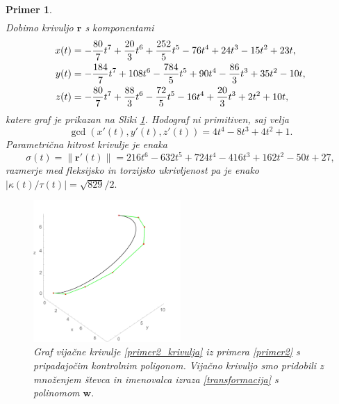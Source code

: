 \documentclass[12pt,a4paper,twoside]{article}
\theoremstyle{definition} %
\theoremstyle{plain} %
\theoremstyle{primerstyle}
\newtheorem{primer}[definicija]{Primer}
\numberwithin{equation}{section}  %
\newcommand{\rV}{\mathbf{r}}
\newcommand{\wV}{\mathbf{w}}
\begin{document}
\begin{primer}
\begin{align*}
	\end{align*}
	Dobimo krivuljo $\rV$ s komponentami
	\begin{align}
		x(t)&=-\frac{80}{7}t^7+\frac{20}{3}t^6+\frac{252}{5}t^5-76t^4+24t^3-15t^2+23t,\notag\\
		y(t)&=-\frac{184}{7}t^7+108t^6-\frac{784}{5}t^5+90t^4-\frac{86}{3}t^3+35t^2-10t,\label{primer2_krivulja}\\
		z(t)&=-\frac{80}{7}t^7+\frac{88}{3}t^6-\frac{72}{5}t^5-16t^4+\frac{20}{3}t^3+2t^2+10t,\notag
	\end{align}
	katere graf je prikazan na Sliki \ref{fig:quat_poly_multi}.
	Hodograf ni primitiven, saj velja
	\begin{equation*}
		\gcd(x'(t),y'(t),z'(t))=4t^4-8t^3+4t^2+1.
	\end{equation*}
	Parametrična hitrost krivulje je enaka
	\begin{equation*}
		\sigma(t)=\lVert\rV'(t)\rVert=216t^6-632t^5+724t^4-416t^3+162t^2-50t+27,
	\end{equation*}
	razmerje med fleksijsko in torzijsko ukrivljenost pa je enako $|\kappa(t)/\tau(t)|=\sqrt{829}/2.$
	\begin{figure}[h!]
	  \centering
	  \includegraphics[width=0.5\textwidth]{images/quat_poly_multi.pdf}
	  \caption[Primer vijačne krivulje, pridobljene s postopkom množenja z linearnim polinomom]{Graf vijačne krivulje \eqref{primer2_krivulja} iz primera \ref{primer2} s pripadajočim kontrolnim poligonom. Vijačno krivuljo smo pridobili z množenjem števca in imenovalca izraza \eqref{transformacija} s polinomom $\wV.$}
	  \label{fig:quat_poly_multi}
	\end{figure}
\end{primer}
\end{document}
